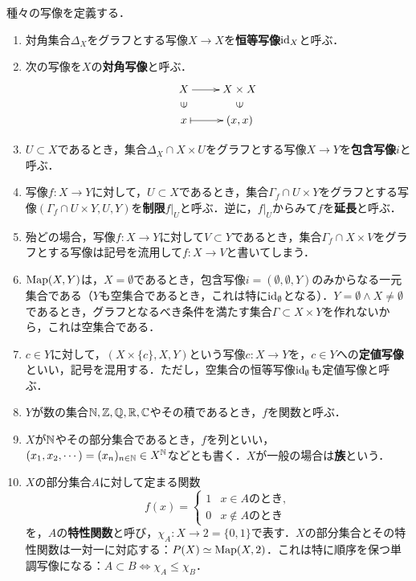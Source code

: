 \documentclass[uplatex, 12pt, dvipdfmx]{jsreport}
\begin{document}
種々の写像を定義する．
\begin{example}\mbox{}
    \begin{enumerate}
        \item 対角集合$\Delta_X$をグラフとする写像$X\to X$を\textbf{恒等写像}$\mathrm{id}_X$と呼ぶ．
        \item 次の写像を$X$の\textbf{対角写像}と呼ぶ．
        \[ \xymatrix@R-2pc{
            X\ar[r]&X\times X\\
            \rotatebox[origin=c]{90}{$\in$}&\rotatebox[origin=c]{90}{$\in$}\\
            x\ar@{|->}[r]&(x,x)
        } \]
        \item $U\subset X$であるとき，集合$\Delta_X\cap X\times U$をグラフとする写像$X\to Y$を\textbf{包含写像}$i$と呼ぶ．
        \item 写像$f:X\to Y$に対して，$U\subset X$であるとき，集合$\Gamma_f\cap U\times Y$をグラフとする写像$(\Gamma_f\cap U\times Y,U,Y)$を\textbf{制限}$f|_U$と呼ぶ．逆に，$f|_U$からみて$f$を\textbf{延長}と呼ぶ．
        \item 殆どの場合，写像$f:X\to Y$に対して$V\subset Y$であるとき，集合$\Gamma_f\cap X\times V$をグラフとする写像は記号を流用して$f:X\to V$と書いてしまう．
        \item $\mathrm{Map}(X,Y)$は，$X=\emptyset$であるとき，包含写像$i=(\emptyset,\emptyset,Y)$のみからなる一元集合である（$Y$も空集合であるとき，これは特に$\mathrm{id}_\emptyset$となる）．$Y=\emptyset\land X\ne\emptyset$であるとき，グラフとなるべき条件を満たす集合$\Gamma\subset X\times Y$を作れないから，これは空集合である．
        \item $c\in Y$に対して，$(X\times\{c\},X,Y)$という写像$c:X\to Y$を，$c\in Y$への\textbf{定値写像}といい，記号を混用する．ただし，空集合の恒等写像$\mathrm{id}_\emptyset$も定値写像と呼ぶ．
        \item $Y$が数の集合$\mathbb{N},\mathbb{Z},\mathbb{Q},\mathbb{R},\mathbb{C}$やその積であるとき，$f$を関数と呼ぶ．
        \item $X$が$\mathbb{N}$やその部分集合であるとき，$f$を列といい，$(x_1,x_2,\cdots)=(x_n)_{n\in\mathbb{N}}\in X^{\mathbb{N}}$などとも書く．$X$が一般の場合は\textbf{族}という．
        \item $X$の部分集合$A$に対して定まる関数\[f(x)=\begin{cases}
            1&x\in Aのとき,\\0&x\notin Aのとき
        \end{cases}\]を，$A$の\textbf{特性関数}と呼び，$\chi_A:X\to 2=\{0,1\}$で表す．$X$の部分集合とその特性関数は一対一に対応する：$P(X)\simeq\mathrm{Map}(X,2)$．これは特に順序を保つ単調写像になる：$A\subset B\Leftrightarrow\chi_A\le\chi_B$．

\end{enumerate}
\end{example}
\end{document}
